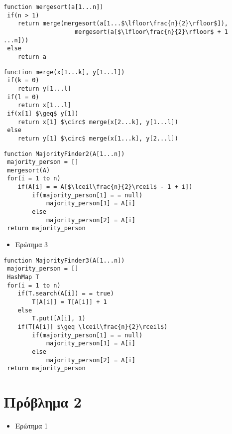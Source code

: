 \documentclass[a4paper]{article}
\begin{document}
\begin{tcolorbox}[colback=blue!20!white,colframe=purple!60!white,title=\textbf{Merge sort}]
\begin{lstlisting}[mathescape]
function mergesort(a[1...n])
 if(n > 1)
 	return merge(mergesort(a[1...$\lfloor\frac{n}{2}\rfloor$]),
                    mergesort(a[$\lfloor\frac{n}{2}\rfloor$ + 1 ...n]))
 else
 	return a
\end{lstlisting}

\begin{lstlisting}[mathescape]
function merge(x[1...k], y[1...l])
 if(k = 0)
 	return y[1...l]
 if(l = 0)
 	return x[1...l]
 if(x[1] $\geq$ y[1])
 	return x[1] $\circ$ merge(x[2...k], y[1...l])
 else
 	return y[1] $\circ$ merge(x[1...k], y[2...l])
\end{lstlisting}
\end{tcolorbox}

\lstset{numbers=left, numbersep=5pt,frame=single,  framexleftmargin=15pt}

\pagebreak

\begin{lstlisting}[mathescape]
function MajorityFinder2(A[1...n])
 majority_person = []
 mergesort(A)
 for(i = 1 to n)
 	if(A[i] = = A[$\lceil\frac{n}{2}\rceil$ - 1 + i])
 		if(majority_person[1] = = null)
 			majority_person[1] = A[i]
 		else
 			majority_person[2] = A[i]
 return majority_person
\end{lstlisting}

\begin{itemize}
\item Ερώτημα 3
\end{itemize}

\begin{lstlisting}[mathescape]
function MajorityFinder3(A[1...n])
 majority_person = []
 HashMap T
 for(i = 1 to n)
 	if(T.search(A[i]) = = true)
 		T[A[i]] = T[A[i]] + 1
 	else 
 		T.put([A[i], 1)
 	if(T[A[i]] $\geq \lceil\frac{n}{2}\rceil$)
 		if(majority_person[1] = = null)
 			majority_person[1] = A[i]
 		else
 			majority_person[2] = A[i]
 return majority_person
\end{lstlisting}

\section*{Πρόβλημα 2}

\begin{itemize}
\item Ερώτημα 1
\end{itemize}
\end{document}
